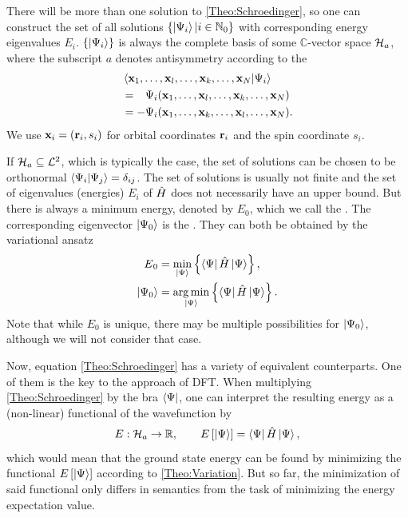There will be more than one solution to \eqref{Theo:Schroedinger}, so one can
construct the set of all solutions $\left\{{\left|\Psi{_i}\right\rangle | i \in \mathbb{N}_0} \right\}$ with
corresponding energy eigenvalues $E_i$. $\left\{{\left|\Psi{_i}\right\rangle} \right\}$ is always the complete
basis of some $\mathbb C$-vector space $\mathcal H_a$, where the subscript $a$ denotes
antisymmetry according to the 
\begin{equation}
\begin{aligned}
 &\bkt{\x_1,\ldots,\x_l,\ldots,\x_k,\ldots,\x_N | \Psi_i } \\
 &=\ph - \Psi_i(\x_1,\ldots,\x_l,\ldots,\x_k,\ldots,\x_N) \\
 &= - \Psi_i(\x_1,\ldots,\x_k,\ldots,\x_l,\ldots,\x_N).
\end{aligned}
\label{Theo:Pauli}
\end{equation}
We use $\mathbf{x}_i=(\mathbf{r}_i,s_i)$ for orbital coordinates $\mathbf{r}_i$ and the spin coordinate $s_i$.

If $\mathcal H_a \subseteq \mathcal {L}^2$, which is typically the case,
the set of solutions can be chosen to be orthonormal \mbox{$\left\langle{\Psi_i |
\Psi_j}\right\rangle = \delta_{ij}$}.
The set of solutions is usually not finite and the set of eigenvalues (energies) $E_i$ of $\hat{H}$
does not necessarily have an upper bound. But there is always a minimum energy,
denoted by $E_0$, which we call the . The corresponding eigenvector 
$\left|\Psi{_0}\right\rangle$ is the . They can both be obtained by the
variational ansatz
\begin{equation}
\begin{aligned}
 E{_0}&= \min_{\left|\Psi{}\right\rangle} \left\{{ \left\langle\Psi{}\right| \hat{H} \left|\Psi{}\right\rangle} \right\}, \\
 \left|\Psi{_0}\right\rangle&= \operatorname*{arg\,min}_{\left|\Psi{}\right\rangle} \left\{{ \left\langle\Psi{}\right| \hat{H} \left|\Psi{}\right\rangle} \right\}.
\end{aligned}
\label{Theo:Variation}
\end{equation}
Note that while $E_0$ is unique, there may be multiple possibilities for $\left|\Psi{_0}\right\rangle$, although
we will not consider that case.

Now, equation \eqref{Theo:Schroedinger} has a variety of equivalent counterparts. One of them
is the key to the approach of DFT. When multiplying \eqref{Theo:Schroedinger} by the bra $\left\langle\Psi{}\right|$,
one can interpret the resulting energy as a (non-linear) functional of the wavefunction by
\begin{equation}
 E : \mathcal H_a \rightarrow \mathbb{R}, \qquad E\left[{\left|\Psi{}\right\rangle}\right]=\left\langle\Psi{}\right| \hat{H} \left|\Psi{}\right\rangle,
 \label{Theo:WaveFunctional}
\end{equation}
which would mean that the ground state energy can be found by minimizing the functional
$E\left[{\left|\Psi{}\right\rangle}\right]$ according to \eqref{Theo:Variation}. But so far, the minimization
of said functional only differs in semantics from the task of minimizing the energy expectation value.

